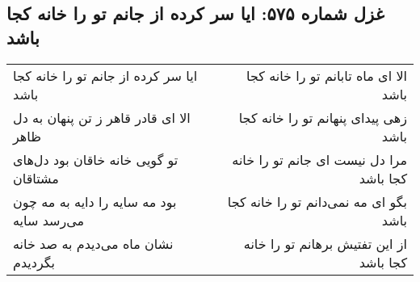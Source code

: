 \begin{center}
\section*{غزل شماره ۵۷۵: ایا سر کرده از جانم تو را خانه کجا باشد}
\label{sec:0575}
\begin{longtable}{l p{0.5cm} r}
ایا سر کرده از جانم تو را خانه کجا باشد
&&
الا ای ماه تابانم تو را خانه کجا باشد
\\
الا ای قادر قاهر ز تن پنهان به دل ظاهر
&&
زهی پیدای پنهانم تو را خانه کجا باشد
\\
تو گویی خانه خاقان بود دل‌های مشتاقان
&&
مرا دل نیست ای جانم تو را خانه کجا باشد
\\
بود مه سایه را دایه به مه چون می‌رسد سایه
&&
بگو ای مه نمی‌دانم تو را خانه کجا باشد
\\
نشان ماه می‌دیدم به صد خانه بگردیدم
&&
از این تفتیش برهانم تو را خانه کجا باشد
\\
\end{longtable}
\end{center}
